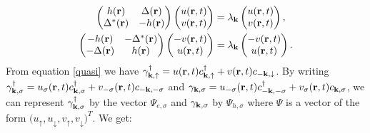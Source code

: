\begin{equation}
\begin{split}
    \begin{pmatrix}
        h(\mathbf{r}) & \Delta(\mathbf{r}) \\
        \Delta^*(\mathbf{r}) & -h(\mathbf{r})
    \end{pmatrix}
    \begin{pmatrix}
        u(\mathbf{r},t) \\ v(\mathbf{r},t)
    \end{pmatrix}
    &=\lambda_{\mathbf{k}}
    \begin{pmatrix}
        u(\mathbf{r},t) \\ v(\mathbf{r},t)
    \end{pmatrix},
    \\
    \begin{pmatrix}
        -h(\mathbf{r}) & -\Delta^*(\mathbf{r}) \\
        -\Delta(\mathbf{r}) & h(\mathbf{r})
    \end{pmatrix}
    \begin{pmatrix}
        -v(\mathbf{r},t) \\ u(\mathbf{r},t)
    \end{pmatrix}
    &=\lambda_{\mathbf{k}}
    \begin{pmatrix}
        -v(\mathbf{r},t) \\ u(\mathbf{r},t)
    \end{pmatrix}.
\end{split}
\label{BdG-1}
\end{equation}
From equation \eqref{quasi} we have $\gamma_{\bf{k},\uparrow}^{\dagger} = u(\mathbf{r},t)c_{\bf{k},\uparrow}^{\dagger} + v(\mathbf{r},t)c_{-\bf{k},\downarrow}$. By writing $\gamma_{\bf{k},\sigma}^{\dagger} = u_{\sigma}(\mathbf{r},t)c_{\bf{k},\sigma}^{\dagger} + v_{-\sigma}(\mathbf{r},t)c_{-\mathbf{k},-\sigma}$ and $\gamma_{\bf{k},\sigma} = u_{-\sigma}(\mathbf{r},t)c_{-\mathbf{k},-\sigma}^{\dagger} + v_{\sigma}(\mathbf{r},t)c_{\bf{k},\sigma}$, we can represent $\gamma_{\bf{k},\sigma}^{\dagger}$ by the vector $\Psi_{e,\sigma}$ and $\gamma_{\bf{k},\sigma}$ by $\Psi_{h,\sigma}$ where $\Psi$ is a vector of the form $\big(u_{\uparrow}, u_{\downarrow}, v_{\uparrow}, v_{\downarrow}\big)^T$. We get:
